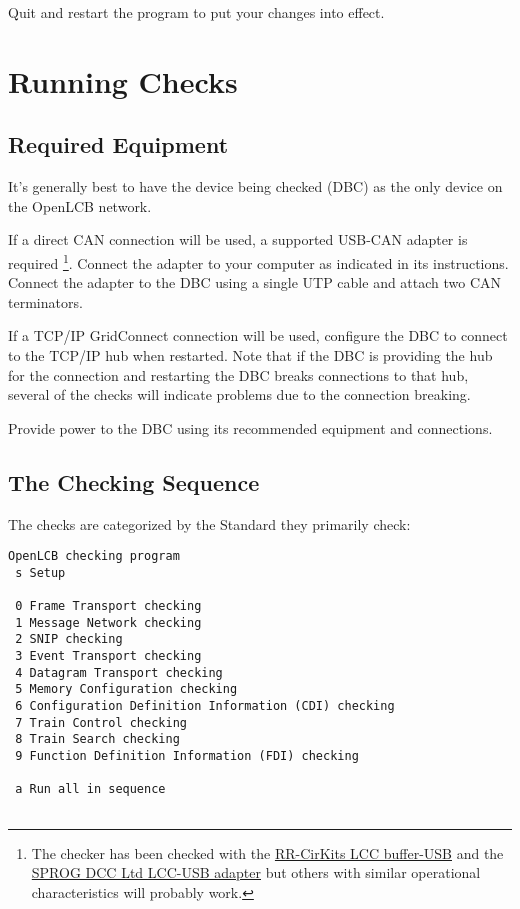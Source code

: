 Quit and restart the program to put your changes into effect.

\section{Running Checks}

\subsection{Required Equipment}

It's generally best to have the device being checked (DBC)
as the only device on the OpenLCB network.

If a direct CAN connection will be used,
a supported USB-CAN adapter is required
\footnote{The checker has been checked with the
\href{https://www.rr-cirkits.com/description/LCC-usb-flyer.pdf}{RR-CirKits LCC buffer-USB}
and the \href{https://www.sprog-dcc.co.uk/lcc-start-page}{SPROG DCC Ltd LCC-USB adapter}
but others with similar operational characteristics will probably work.
}.
Connect the adapter to your computer as indicated in its instructions.
Connect the adapter to the DBC using a single UTP cable
and attach two CAN terminators.

If a TCP/IP GridConnect connection will be used,
configure the DBC to connect to the TCP/IP hub when restarted. Note that if
the DBC is providing the hub for the connection and restarting the DBC
breaks connections to that hub, several of the checks will indicate problems
due to the connection breaking.

Provide power to the DBC using its recommended equipment and connections.

\subsection{The Checking Sequence}

The checks are categorized by the Standard they primarily check:

\begin{verbatim}
OpenLCB checking program
 s Setup

 0 Frame Transport checking
 1 Message Network checking
 2 SNIP checking
 3 Event Transport checking
 4 Datagram Transport checking
 5 Memory Configuration checking
 6 Configuration Definition Information (CDI) checking
 7 Train Control checking
 8 Train Search checking
 9 Function Definition Information (FDI) checking
  
 a Run all in sequence
 
\end{verbatim}

